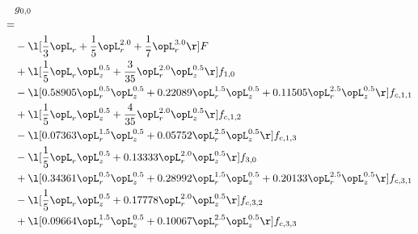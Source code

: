 \begin{alignat}{2} 
\label{eq:g_00_0} 
& g_{0,0} \nonumber \\ 
 = \\ 
& - \l[ \frac{1}{3} \opL_r + \frac{1}{5} \opL_r^{2.0} + \frac{1}{7} \opL_r^{3.0}  \r] F \nonumber \\ 
& + \l[ \frac{1}{5} \opL_r \opL_z^{0.5} + \frac{3}{35} \opL_r^{2.0} \opL_z^{0.5}  \r] f_{1,0} \nonumber \\ 
& - \l[  0.58905 \opL_r^{0.5} \opL_z^{0.5} +  0.22089 \opL_r^{1.5} \opL_z^{0.5} +  0.11505 \opL_r^{2.5} \opL_z^{0.5}  \r] f_{c,1,1} \nonumber \\ 
& + \l[ \frac{1}{5} \opL_r \opL_z^{0.5} + \frac{4}{35} \opL_r^{2.0} \opL_z^{0.5}  \r] f_{c,1,2} \nonumber \\ 
& - \l[  0.07363 \opL_r^{1.5} \opL_z^{0.5} +  0.05752 \opL_r^{2.5} \opL_z^{0.5}  \r] f_{c,1,3} \nonumber \\ 
& - \l[ \frac{1}{5} \opL_r \opL_z^{0.5} +  0.13333 \opL_r^{2.0} \opL_z^{0.5}  \r] f_{3,0} \nonumber \\ 
& + \l[  0.34361 \opL_r^{0.5} \opL_z^{0.5} +  0.28992 \opL_r^{1.5} \opL_z^{0.5} +  0.20133 \opL_r^{2.5} \opL_z^{0.5}  \r] f_{c,3,1} \nonumber \\ 
& - \l[ \frac{1}{5} \opL_r \opL_z^{0.5} +  0.17778 \opL_r^{2.0} \opL_z^{0.5}  \r] f_{c,3,2} \nonumber \\ 
& + \l[  0.09664 \opL_r^{1.5} \opL_z^{0.5} +  0.10067 \opL_r^{2.5} \opL_z^{0.5}  \r] f_{c,3,3} \nonumber \\ 
\end{alignat} 


